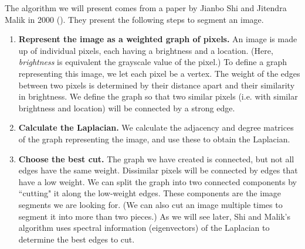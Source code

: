 The algorithm we will present comes from a paper by Jianbo Shi and Jitendra Malik in 2000 (\cite{Shi2000}).
They present the following steps to segment an image.
\begin{enumerate}
	\item \textbf{Represent the image as a weighted graph of pixels.} 
An image is made up of individual pixels, each having a brightness and a location.
(Here, \emph{brightness} is equivalent the grayscale value of the pixel.)
To define a graph representing this image, we let each pixel be a vertex.
The weight of the edges between two pixels is determined by their distance apart and their similarity in brightness.
We define the graph so that two similar pixels (i.e. with similar brightness and location) will be connected by a strong edge.
	\item \textbf{Calculate the Laplacian.} 
We calculate the adjacency and degree matrices of the graph representing the image, and use these to obtain the Laplacian.
	\item \textbf{Choose the best cut.} 
The graph we have created is connected, but not all edges have the same weight.
Dissimilar pixels will be connected by edges that have a low weight.
We can split the graph into two connected components by ``cutting" it along the low-weight edges.
These components are the image segments we are looking for.
(We can also cut an image multiple times to segment it into more than two pieces.)
As we will see later, Shi and Malik's algorithm uses spectral information (eigenvectors) of the Laplacian to determine the best edges to cut.
\end{enumerate}

